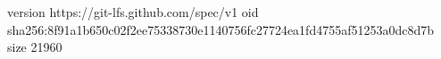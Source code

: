 version https://git-lfs.github.com/spec/v1
oid sha256:8f91a1b650c02f2ee75338730e1140756fc27724ea1fd4755af51253a0dc8d7b
size 21960
